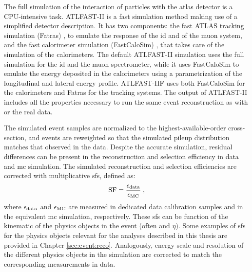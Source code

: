 The full simulation of the interaction of particles with the \gls{atlas} detector is a CPU-intensive task. 
ATLFAST-II \cite{Aad:2010ah} is a fast simulation method 
making use of a simplified detector description. 
It has two components: the fast ATLAS tracking simulation (Fatras) \cite{Edmonds:2008zz}, to emulate the response of the \gls{id} and of the muon system, 
and the fast calorimeter simulation (FastCaloSim) \cite{ATL-PHYS-PUB-2010-013}, that takes care of the simulation of the calorimeters. The default ATLFAST-II simulation uses the full \geant simulation for the \gls{id} and the muon spectrometer, 
while it uses FastCaloSim to emulate the energy deposited in the calorimeters using a parametrization of the longitudinal and lateral energy profile. 
ATLFAST-IIF uses both FastCaloSim for the calorimeters and Fatras for the tracking systems. 
The output of ATLFAST-II includes all the properties necessary to run the same event reconstruction as with \geant or the real data.


The simulated event samples are normalized to the highest-available-order cross-section, 
and events are reweighted so that the simulated pileup distribution matches that observed in the data.
Despite the accurate simulation, residual differences can be present in the reconstruction and selection efficiency in data and \gls{mc} simulation. 
The simulated reconstruction and selection efficiencies are corrected with multiplicative \glspl{sf}, defined as:
\begin{equation}
{\rm SF} = \frac{\epsilon_{\rm data}}{\epsilon_{\rm MC}} \; ,
\end{equation}
\noindent where $\epsilon_{\rm data}$ and $\epsilon_{\rm MC}$ are measured in dedicated data calibration samples 
and in the equivalent \gls{mc} simulation, respectively.
These \glspl{sf} can be function of the kinematic of the physics objects in the event (often \pt and $\eta$). 
Some examples of \glspl{sf} for the physics objects relevant for the analyses described in this thesis are provided in Chapter \ref{sec:event:reco}.
Analogously, energy scale and resolution of the different physics objects in the simulation are corrected 
to match the corresponding measurements in data.



